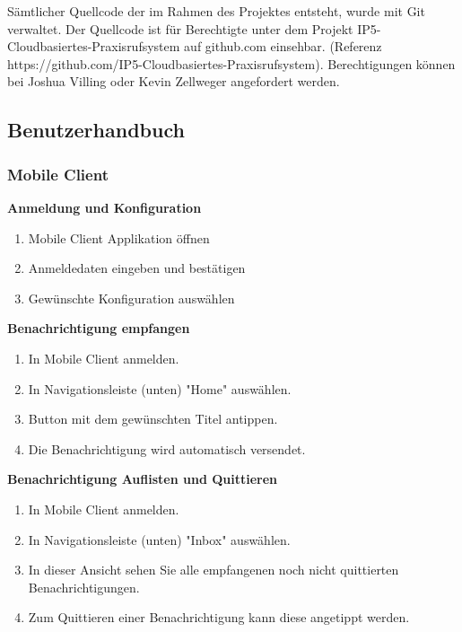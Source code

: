     Sämtlicher Quellcode der im Rahmen des Projektes entsteht, wurde mit Git verwaltet. Der Quellcode ist für Berechtigte unter dem Projekt IP5-Cloudbasiertes-Praxisrufsystem auf github.com einsehbar.
    (Referenz https://github.com/IP5-Cloudbasiertes-Praxisrufsystem). Berechtigungen können bei Joshua Villing oder Kevin Zellweger angefordert werden.

    \subsection{Benutzerhandbuch}

        \subsubsection*{Mobile Client}

        \textbf{Anmeldung und Konfiguration}

        \begin{enumerate}
            \item Mobile Client Applikation öffnen
            \item Anmeldedaten eingeben und bestätigen
            \item Gewünschte Konfiguration auswählen
        \end{enumerate}

        \textbf{Benachrichtigung empfangen}

        \begin{enumerate}
            \item In Mobile Client anmelden.
            \item In Navigationsleiste (unten) "Home" auswählen.
            \item Button mit dem gewünschten Titel antippen.
            \item Die Benachrichtigung wird automatisch versendet.
        \end{enumerate}

        \textbf{Benachrichtigung Auflisten und Quittieren}

        \begin{enumerate}
            \item In Mobile Client anmelden.
            \item In Navigationsleiste (unten) "Inbox" auswählen.
            \item In dieser Ansicht sehen Sie alle empfangenen noch nicht quittierten Benachrichtigungen.
            \item Zum Quittieren einer Benachrichtigung kann diese angetippt werden.
        \end{enumerate}

